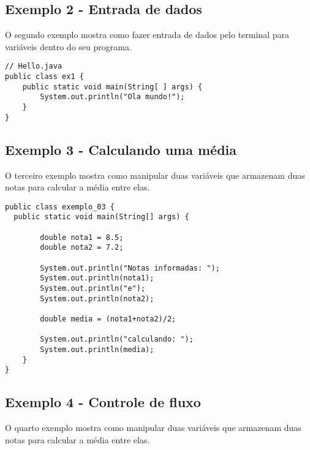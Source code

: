 \documentclass[12pt]{article}
\begin{document}
\subsection{Exemplo 2 - Entrada de dados}

O segundo exemplo mostra como fazer entrada de dados pelo terminal para variáveis dentro do seu programa.

\begin{lstlisting}
// Hello.java
public class ex1 {
	public static void main(String[ ] args) {
        System.out.println("Ola mundo!");
    }
}
\end{lstlisting}


\subsection{Exemplo 3 - Calculando uma média}

O terceiro exemplo mostra como manipular duas variáveis que armazenam duas notas para calcular a média entre elas.

\begin{lstlisting}
public class exemplo_03 {
  public static void main(String[] args) {
              
        double nota1 = 8.5;
        double nota2 = 7.2;

        System.out.println("Notas informadas: ");
        System.out.println(nota1);
        System.out.println("e");
        System.out.println(nota2);        
        
        double media = (nota1+nota2)/2;

        System.out.println("calculando: ");
        System.out.println(media);       
    }
}
\end{lstlisting}



\subsection{Exemplo 4 - Controle de fluxo}

O quarto exemplo  mostra como manipular duas variáveis que armazenam duas notas para calcular a média entre elas.
\end{document}
